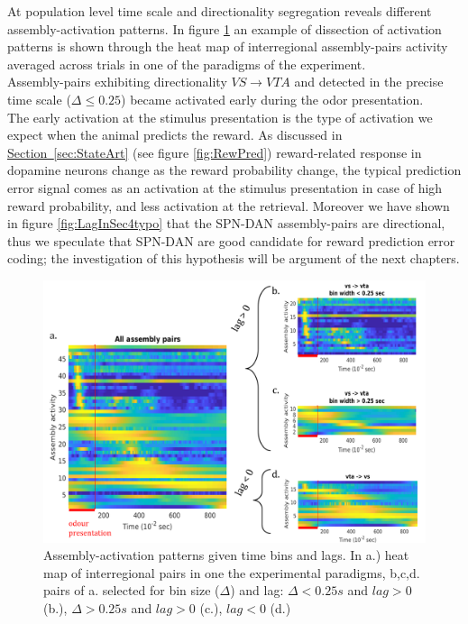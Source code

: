 At population level time scale and directionality segregation reveals different assembly-activation patterns. In figure \ref{fig:AsActBinLag} an example of dissection of activation patterns is shown through the heat map of interregional assembly-pairs activity averaged across trials in one of the paradigms of the experiment.\\Assembly-pairs exhibiting directionality $VS \rightarrow VTA$ and detected in the precise time scale ($\Delta \le 0.25$) became activated early during the odor presentation.\\The early activation at the stimulus presentation is the type of activation we expect when the animal predicts the reward. As discussed in \hyperref[sec:StateArt]{Section~\ref*{sec:StateArt}} (see figure \ref{fig:RewPred}) reward-related response in dopamine neurons change as the reward probability change, the typical prediction error signal comes as an activation at the stimulus presentation in case of high reward probability, and less activation at the retrieval. Moreover we have shown in figure \ref{fig:LagInSec4typo} that the SPN-DAN assembly-pairs are directional, thus we speculate that SPN-DAN are good candidate for reward prediction error coding; the investigation of this hypothesis will be argument of the next chapters.\\
\begin{figure}[h!]
    \centering
    \includegraphics[scale=0.56]{figures/AsActPerBinLag1.png}
    \caption{Assembly-activation patterns given time bins and lags. In a.) heat map of interregional pairs in one the experimental paradigms, b,c,d. pairs of a. selected for bin size ($\Delta$) and lag: $\Delta < 0.25 s$ and $lag > 0$ (b.), $\Delta > 0.25 s$ and $lag > 0$ (c.), $lag < 0$ (d.)}
    \label{fig:AsActBinLag}
\end{figure}
